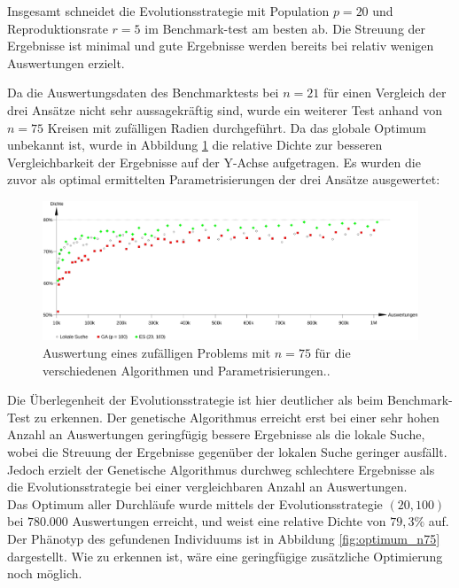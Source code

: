 \documentclass[twoside,bibtotoc]{report}
\begin{document}
Insgesamt schneidet die Evolutionsstrategie mit Population $p = 20$ und Reproduktionsrate $r = 5$ im Benchmark-test am besten ab.
Die Streuung der Ergebnisse ist minimal und gute Ergebnisse werden bereits bei relativ wenigen Auswertungen erzielt.

\nsecend%


Da die Auswertungsdaten des Benchmarktests bei $n = 21$ für einen Vergleich der drei Ansätze nicht sehr aussagekräftig sind, wurde ein weiterer Test anhand von $n = 75$ Kreisen mit zufälligen Radien durchgeführt.
Da das globale Optimum unbekannt ist, wurde in Abbildung \ref{fig:test_n75} die relative Dichte zur besseren Vergleichbarkeit der Ergebnisse auf der Y-Achse aufgetragen.
Es wurden die zuvor als optimal ermittelten Parametrisierungen der drei Ansätze ausgewertet:\\

\begin{figure}[h]
 \centering
 \includegraphics [width=1\textwidth]{Bilder/test_n75.png}
 \caption{
 	Auswertung eines zufälligen Problems mit $n = 75$ für die verschiedenen Algorithmen und Parametrisierungen..
 	}
 \label{fig:test_n75}
\end{figure}

Die Überlegenheit der Evolutionsstrategie ist hier deutlicher als beim Benchmark-Test zu erkennen.
Der genetische Algorithmus erreicht erst bei einer sehr hohen Anzahl an Auswertungen geringfügig bessere Ergebnisse als die lokale Suche, wobei die Streuung der Ergebnisse gegenüber der lokalen Suche geringer ausfällt. Jedoch erzielt der Genetische Algorithmus durchweg schlechtere Ergebnisse als die Evolutionsstrategie bei einer vergleichbaren Anzahl an Auswertungen.\\

Das Optimum aller Durchläufe wurde mittels der Evolutionsstrategie $(20, 100)$ bei $780.000$ Auswertungen erreicht, und weist eine relative Dichte von $79,3\%$ auf.
Der Phänotyp des gefundenen Individuums ist in Abbildung \ref{fig:optimum_n75} dargestellt.
Wie zu erkennen ist, wäre eine geringfügige zusätzliche Optimierung noch möglich.\\
\end{document}
